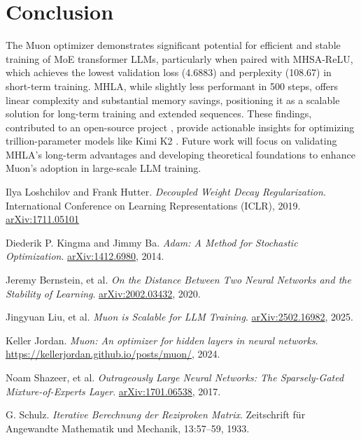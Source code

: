 \documentclass[11pt, a4paper]{article}
\begin{document}
{{\section{Conclusion}
The Muon optimizer demonstrates significant potential for efficient and stable training of MoE transformer LLMs, particularly when paired with MHSA-ReLU, which achieves the lowest validation loss (4.6883) and perplexity (108.67) in short-term training. MHLA, while slightly less performant in 500 steps, offers linear complexity and substantial memory savings, positioning it as a scalable solution for long-term training and extended sequences. These findings, contributed to an open-source project \cite{rosic2025muonrepo}, provide actionable insights for optimizing trillion-parameter models like Kimi K2 \cite{moonshot2025kimi}. Future work will focus on validating MHLA’s long-term advantages and developing theoretical foundations to enhance Muon’s adoption in large-scale LLM training.

\begin{thebibliography}{9}
Ilya Loshchilov and Frank Hutter.
\textit{Decoupled Weight Decay Regularization}.
International Conference on Learning Representations (ICLR), 2019.  
\href{https://arxiv.org/abs/1711.05101}{arXiv:1711.05101}

Diederik P. Kingma and Jimmy Ba.  
\textit{Adam: A Method for Stochastic Optimization}.  
\href{https://arxiv.org/abs/1412.6980}{arXiv:1412.6980}, 2014.

Jeremy Bernstein, et al.
\textit{On the Distance Between Two Neural Networks and the Stability of Learning}.  
\href{https://arxiv.org/abs/2002.03432}{arXiv:2002.03432}, 2020.

Jingyuan Liu, et al.  
\textit{Muon is Scalable for LLM Training}.  
\href{https://arxiv.org/abs/2502.16982}{arXiv:2502.16982}, 2025.

Keller Jordan.  
\textit{Muon: An optimizer for hidden layers in neural networks}.  
\url{https://kellerjordan.github.io/posts/muon/}, 2024.

Noam Shazeer, et al.  
\textit{Outrageously Large Neural Networks: The Sparsely-Gated Mixture-of-Experts Layer}.  
\href{https://arxiv.org/abs/1701.06538}{arXiv:1701.06538}, 2017.

G. Schulz.  
\textit{Iterative Berechnung der Reziproken Matrix}.  
Zeitschrift für Angewandte Mathematik und Mechanik, 13:57–59, 1933.


\end{thebibliography}}}
\end{document}

